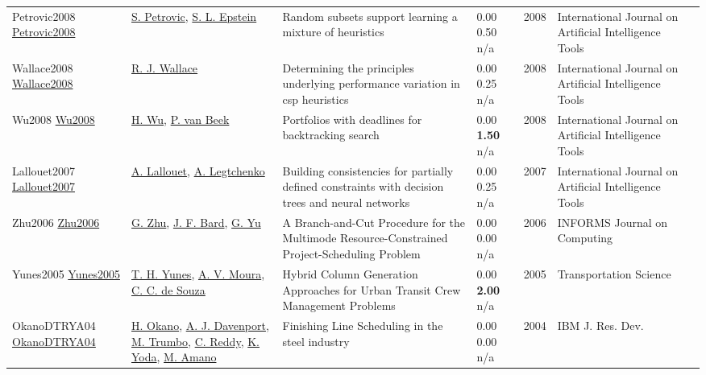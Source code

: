 {\begin{longtable}{p{3cm}p{5cm}p{10cm}p{1cm}rp{2.5cm}l}
Petrovic2008 \href{http://dx.doi.org/10.1142/s0218213008004023}{Petrovic2008} & \hyperref[auth:a1858]{S. Petrovic}, \hyperref[auth:a1859]{S. L. Epstein} & \cellcolor{green!10}Random subsets support learning a mixture of heuristics & \noindent{}\textcolor{black!50}{0.00} 0.50 n/a & 2008 & International Journal on Artificial Intelligence Tools & \cite{Petrovic2008}\\
Wallace2008 \href{http://dx.doi.org/10.1142/s0218213008004199}{Wallace2008} & \hyperref[auth:a1267]{R. J. Wallace} & Determining the principles underlying performance variation in csp heuristics & \noindent{}\textcolor{black!50}{0.00} 0.25 n/a & 2008 & International Journal on Artificial Intelligence Tools & \cite{Wallace2008}\\
Wu2008 \href{http://dx.doi.org/10.1142/s0218213008004187}{Wu2008} & \hyperref[auth:a2057]{H. Wu}, \hyperref[auth:a609]{P. van Beek} & Portfolios with deadlines for backtracking search & \noindent{}\textcolor{black!50}{0.00} \textbf{1.50} n/a & 2008 & International Journal on Artificial Intelligence Tools & \cite{Wu2008}\\
Lallouet2007 \href{http://dx.doi.org/10.1142/s0218213007003503}{Lallouet2007} & \hyperref[auth:a427]{A. Lallouet}, \hyperref[auth:a1932]{A. Legtchenko} & Building consistencies for partially defined constraints with decision trees and neural networks & \noindent{}\textcolor{black!50}{0.00} 0.25 n/a & 2007 & International Journal on Artificial Intelligence Tools & \cite{Lallouet2007}\\
Zhu2006 \href{http://dx.doi.org/10.1287/ijoc.1040.0121}{Zhu2006} & \hyperref[auth:a1526]{G. Zhu}, \hyperref[auth:a1527]{J. F. Bard}, \hyperref[auth:a1528]{G. Yu} & A Branch-and-Cut Procedure for the Multimode Resource-Constrained Project-Scheduling Problem & \noindent{}\textcolor{black!50}{0.00} \textcolor{black!50}{0.00} n/a & 2006 & \cellcolor{red!20}INFORMS Journal on Computing & \cite{Zhu2006}\\
Yunes2005 \href{http://dx.doi.org/10.1287/trsc.1030.0078}{Yunes2005} & \hyperref[auth:a941]{T. H. Yunes}, \hyperref[auth:a1578]{A. V. Moura}, \hyperref[auth:a170]{C. C. de Souza} & Hybrid Column Generation Approaches for Urban Transit Crew Management Problems & \noindent{}\textcolor{black!50}{0.00} \textbf{2.00} n/a & 2005 & \cellcolor{red!20}Transportation Science & \cite{Yunes2005}\\
OkanoDTRYA04 \href{https://doi.org/10.1147/rd.485.0811}{OkanoDTRYA04} & \hyperref[auth:a1287]{H. Okano}, \hyperref[auth:a248]{A. J. Davenport}, \hyperref[auth:a1288]{M. Trumbo}, \hyperref[auth:a250]{C. Reddy}, \hyperref[auth:a1289]{K. Yoda}, \hyperref[auth:a1290]{M. Amano} & Finishing Line Scheduling in the steel industry & \noindent{}\textcolor{black!50}{0.00} \textcolor{black!50}{0.00} n/a & 2004 & {IBM} J. Res. Dev. & \cite{OkanoDTRYA04}\\

\end{longtable}}
